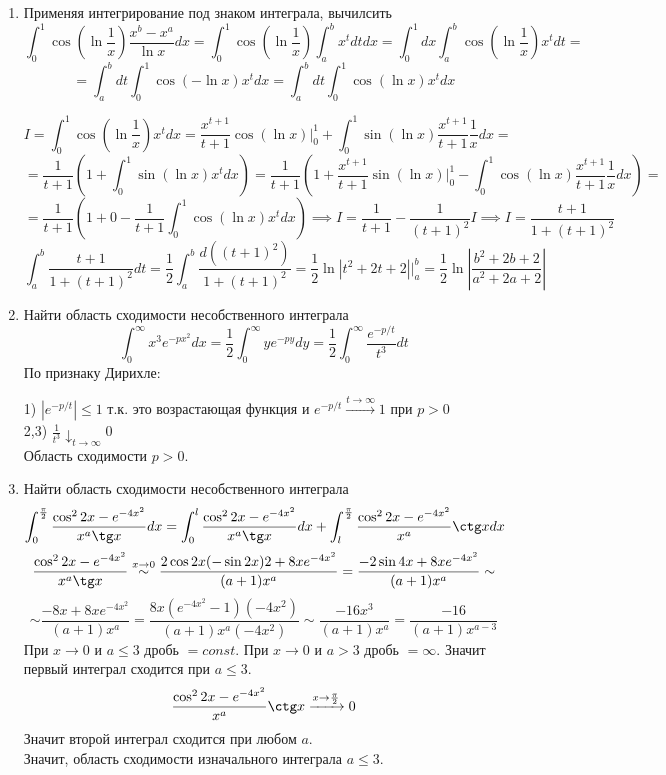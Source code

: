 \documentclass{article}
\begin{document}
\begin{large}
\begin{enumerate}
\item Применяя интегрирование под знаком интеграла, вычилсить 
$$ \int_0^1 \cos \left( \ln \frac{1}{x} \right) \frac{x^b - x^a}{\ln x} dx = \int_0^1 \cos \left( \ln \frac{1}{x} \right) \int_a^b x^t dt dx = \int_0^1 dx \int_a^b \cos \left( \ln \frac{1}{x} \right) x^t dt = $$
$$ =  \int_a^b dt \int_0^1 \cos \left( -\ln x \right) x^t dx = \int_a^b dt \int_0^1 \cos \left( \ln x \right) x^t dx $$


$$ I = \int_0^1 \cos \left( \ln \frac{1}{x} \right) x^t dx = \frac{x^{t+1}}{t+1} \cos (\ln x) \Big| _0^1 + \int_0^1 \sin \left( \ln x \right) \frac{x^{t+1}}{t+1} \frac{1}{x} dx = $$ 
$$ = \frac{1}{t+1} \left(1+ \int_0^1 \sin \left( \ln x \right) x^t dx \right) = \frac{1}{t+1} \left(1+ \frac{x^{t+1}}{t+1} \sin (\ln x) \Big|_0^1 - \int_0^1 \cos \left( \ln x \right) \frac{x^{t+1}}{t+1} \frac{1}{x} dx \right) = $$
$$ = \frac{1}{t+1} \left( 1 + 0 - \frac{1}{t+1} \int_0^1 \cos \left( \ln x \right) x^t dx \right) \implies I = \frac{1}{t+1} - \frac{1}{(t+1)^2}I \implies I = \frac{t+1}{1+(t+1)^2} $$
$$ \int_a^b \frac{t+1}{1+(t+1)^2} dt = \frac{1}{2}\int_a^b \frac{d((t+1)^2)}{1+(t+1)^2} = \frac{1}{2} \ln \left| t^2+2t+2 \right| \Big|_a^b = \frac{1}{2} \ln \left| \frac{b^2+2b+2}{a^2+2a+2} \right| $$

\item Найти область сходимости несобственного интеграла
$$ \int_0^\infty x^3 e^{-px^2} dx = \frac{1}{2} \int_0^\infty y e^{-py}dy = \frac{1}{2} \int_0^\infty \frac{e^{-p/t}}{t^3}dt$$
По признаку Дирихле:

1) $ \left| e^{-p/t} \right| \leq 1$ т.к. это возрастающая функция и $e^{-p/t} \xrightarrow{t \to \infty} 1$ при $p > 0$ \\
2,3) $ \frac{1}{t^3} \downarrow_{t\to\infty}0$\\
Область сходимости $p > 0$.

\item Найти область сходимости несобственного интеграла
$$ \int_0^{\frac{\pi}{2}} \frac{\cos^2 2x - e^{-4x^2}}{x^a \tg x} dx = \int_0^{l} \frac{\cos^2 2x - e^{-4x^2}}{x^a \tg x} dx + \int_l^{\frac{\pi}{2}} \frac{\cos^2 2x - e^{-4x^2}}{x^a} \ctg x dx $$
$$ \frac{\cos^2 2x - e^{-4x^2}}{x^a \tg x} \stackrel{x\to0}{\sim} \frac{2\cos 2x (-\sin 2x) 2 + 8x e^{-4x^2}}{(a+1)x^a} = \frac{-2\sin 4x +8x e^{-4x^2}}{(a+1)x^a} \sim $$
$$ \sim \frac{-8x + 8x e^{-4x^2}}{(a+1)x^a} = \frac{8x(e^{-4x^2} - 1)(-4x^2)}{(a+1)x^a(-4x^2)} \sim \frac{-16x^3}{(a+1)x^a} = \frac{-16}{(a+1)x^{a-3}} $$
При $x\to0$ и $a \leq 3$ дробь $= const$. При $x\to0$ и $a > 3$ дробь $= \infty$. Значит первый интеграл сходится при $a \leq 3$.
$$ \frac{\cos^2 2x - e^{-4x^2}}{x^a} \ctg x \xrightarrow{x\to \frac{\pi}{2}} 0 $$
Значит второй интеграл сходится при любом $a$. \\
Значит, область сходимости изначального интеграла $a \leq 3$.


\end{enumerate}
\end{large}
\end{document}
